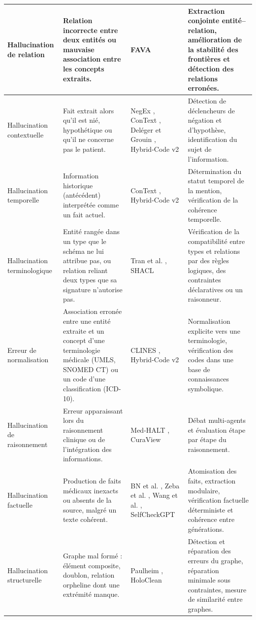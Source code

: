 {\begin{longtable}{|>{\raggedright\arraybackslash}p{2.6cm}|>{\raggedright\arraybackslash}p{4.2cm}|>{\raggedright\arraybackslash}p{3.4cm}|>{\raggedright\arraybackslash}p{4.0cm}|}
\hline
Hallucination de relation &
Relation incorrecte entre deux entités ou mauvaise association entre les concepts extraits. &
FAVA \cite{mishra2024fava} &
Extraction conjointe entité--relation, amélioration de la stabilité des frontières et détection des relations erronées.\\
\hline
Hallucination contextuelle &
Fait extrait alors qu'il est nié, hypothétique ou qu'il ne concerne pas le patient. &
NegEx \cite{chapman2001negex}, ConText \cite{harkema2009context}, Deléger et Grouin \cite{deleger2012negation}, Hybrid-Code v2 \cite{hybrid2512v2} &
Détection de déclencheurs de négation et d'hypothèse, identification du sujet de l'information.\\
\hline
Hallucination temporelle &
Information historique (antécédent) interprétée comme un fait actuel. &
ConText \cite{harkema2009context}, Hybrid-Code v2 \cite{hybrid2512v2} &
Détermination du statut temporel de la mention, vérification de la cohérence temporelle.\\
\hline
Hallucination terminologique &
Entité rangée dans un type que le schéma ne lui attribue pas, ou relation reliant deux types que sa signature n'autorise pas. &
Tran et al. \cite{tran2025aspworkflow}, SHACL \cite{shacl2017} &
Vérification de la compatibilité entre types et relations par des règles logiques, des contraintes déclaratives ou un raisonneur.\\
\hline
Erreur de normalisation &
Association erronée entre une entité extraite et un concept d'une terminologie médicale (UMLS, SNOMED CT) ou un code d'une classification (ICD-10). &
CLINES \cite{yang2025clines}, Hybrid-Code v2 \cite{hybrid2512v2} &
Normalisation explicite vers une terminologie, vérification des codes dans une base de connaissances symbolique.\\
\hline
Hallucination de raisonnement &
Erreur apparaissant lors du raisonnement clinique ou de l'intégration des informations. &
Med-HALT \cite{pal2023medhalt}, CuraView \cite{ye2026curaview} &
Débat multi-agents et évaluation étape par étape du raisonnement.\\
\hline
Hallucination factuelle &
Production de faits médicaux inexacts ou absents de la source, malgré un texte cohérent. &
BN et al. \cite{bn2025fact}, Zeba et al. \cite{zeba2026mitigating}, Wang et al. \cite{wang2024feature}, SelfCheckGPT \cite{manakul2023selfcheckgpt} &
Atomisation des faits, extraction modulaire, vérification factuelle déterministe et cohérence entre générations.\\
\hline
Hallucination structurelle &
Graphe mal formé : élément composite, doublon, relation orpheline dont une extrémité manque. &
Paulheim \cite{paulheim2017refinement}, HoloClean \cite{rekatsinas2017holoclean} &
Détection et réparation des erreurs du graphe, réparation minimale sous contraintes, mesure de similarité entre graphes.\\
\end{longtable}
}

